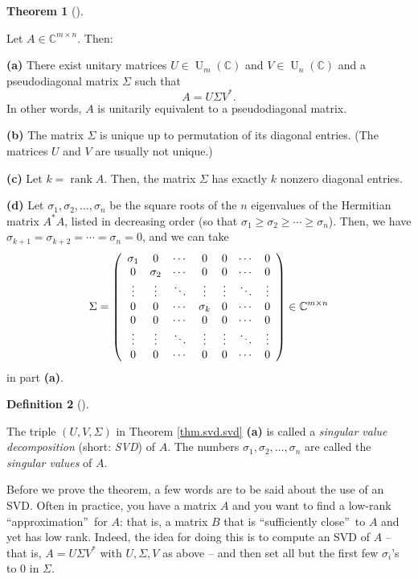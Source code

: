 \documentclass[numbers=enddot,12pt,final,onecolumn,notitlepage]{scrartcl}%
\numberwithin{exer}{subsection}
\theoremstyle{definition}
\newtheorem{theo}{Theorem}[subsection]
\newenvironment{theorem}[1][]
{\begin{theo}[#1]\begin{leftbar}}
{\end{leftbar}\end{theo}}
\newtheorem{defi}[theo]{Definition}
\newenvironment{definition}[1][]
{\begin{defi}[#1]\begin{leftbar}}
{\end{leftbar}\end{defi}}
\begin{document}
\begin{theorem}
[SVD]\label{thm.svd.svd}Let $A\in\mathbb{C}^{m\times n}$. Then: \medskip

\textbf{(a)} There exist unitary matrices $U\in\operatorname*{U}%
\nolimits_{m}\left(  \mathbb{C}\right)  $ and $V\in\operatorname*{U}%
\nolimits_{n}\left(  \mathbb{C}\right)  $ and a pseudodiagonal matrix $\Sigma$
such that%
\[
A=U\Sigma V^{\ast}.
\]
In other words, $A$ is unitarily equivalent to a pseudodiagonal matrix.
\medskip

\textbf{(b)} The matrix $\Sigma$ is unique up to permutation of its diagonal
entries. (The matrices $U$ and $V$ are usually not unique.) \medskip

\textbf{(c)} Let $k=\operatorname*{rank}A$. Then, the matrix $\Sigma$ has
exactly $k$ nonzero diagonal entries. \medskip

\textbf{(d)} Let $\sigma_{1},\sigma_{2},\ldots,\sigma_{n}$ be the square roots
of the $n$ eigenvalues of the Hermitian matrix $A^{\ast}A$, listed in
decreasing order (so that $\sigma_{1}\geq\sigma_{2}\geq\cdots\geq\sigma_{n}$).
Then, we have $\sigma_{k+1}=\sigma_{k+2}=\cdots=\sigma_{n}=0$, and we can
take
\[
\Sigma=\left(
\begin{array}
[c]{ccccccc}%
\sigma_{1} & 0 & \cdots & 0 & 0 & \cdots & 0\\
0 & \sigma_{2} & \cdots & 0 & 0 & \cdots & 0\\
\vdots & \vdots & \ddots & \vdots & \vdots & \ddots & \vdots\\
0 & 0 & \cdots & \sigma_{k} & 0 & \cdots & 0\\
0 & 0 & \cdots & 0 & 0 & \cdots & 0\\
\vdots & \vdots & \ddots & \vdots & \vdots & \ddots & \vdots\\
0 & 0 & \cdots & 0 & 0 & \cdots & 0
\end{array}
\right)  \in\mathbb{C}^{m\times n}%
\]
in part \textbf{(a)}.
\end{theorem}

\begin{definition}
The triple $\left(  U,V,\Sigma\right)  $ in Theorem \ref{thm.svd.svd}
\textbf{(a)} is called a \emph{singular value decomposition} (short:
\emph{SVD}) of $A$. The numbers $\sigma_{1},\sigma_{2},\ldots,\sigma_{n}$ are
called the \emph{singular values} of $A$.
\end{definition}

Before we prove the theorem, a few words are to be said about the use of an
SVD. Often in practice, you have a matrix $A$ and you want to find a low-rank
\textquotedblleft approximation\textquotedblright\ for $A$: that is, a matrix
$B$ that is \textquotedblleft sufficiently close\textquotedblright\ to $A$ and
yet has low rank. Indeed, the idea for doing this is to compute an SVD of $A$
-- that is, $A=U\Sigma V^{\ast}$ with $U,\Sigma,V$ as above -- and then set
all but the first few $\sigma_{i}$'s to $0$ in $\Sigma$.
\end{document}
